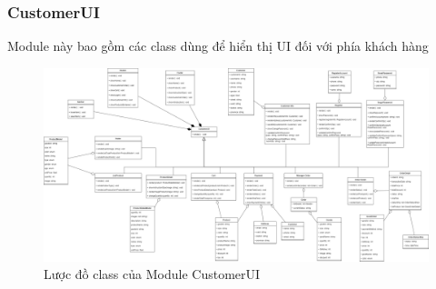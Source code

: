 \subsubsection{CustomerUI}
Module này bao gồm các class dùng để hiển thị UI đối với phía khách hàng
\begin{figure}[!htp]
    \centering
    \includegraphics[width=17cm]{img/Architecture/UI/customer UI.png}
    \newline
    \caption{Lược đồ class của Module CustomerUI}
\end{figure}
 
